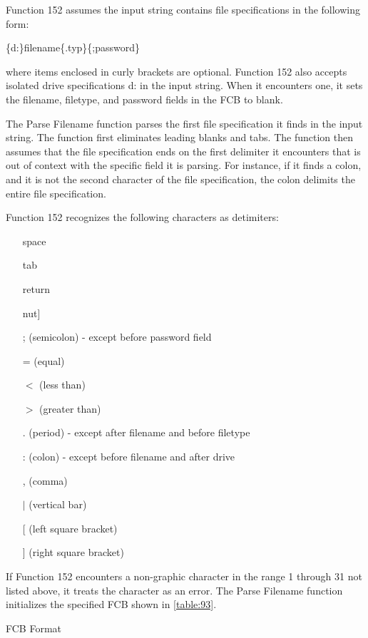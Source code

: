 Function 152 assumes the input string contains file specifications in
the following form:

\{d:\}filename\{.typ\}\{;password\}

where items enclosed in curly brackets are optional. Function 152 also
accepts isolated drive specifications d: in the input string. When it
encounters one, it sets the filename, filetype, and password fields in
the FCB to blank.

The Parse Filename function parses the first file specification it
finds in the input string. The function first eliminates leading
blanks and tabs. The function then assumes that the file specification
ends on the first delimiter it encounters that is out of context with
the specific field it is parsing. For instance, if it finds a colon,
and it is not the second character of the file specification, the
colon delimits the entire file specification.

Function 152 recognizes the following characters as detimiters:

\begin{itemize}
\item[] space
\item[] tab
\item[] return
\item[] nut]
\item[] ; (semicolon) - except before password field
\item[] = (equal)
\item[] \(<\) (less than)
\item[] \(>\) (greater than)
\item[] . (period) - except after filename and before filetype
\item[] : (colon) - except before filename and after drive
\item[] , (comma)
\item[] \(|\) (vertical bar)
\item[] [ (left square bracket)
\item[] ] (right square bracket)
\end{itemize}

If Function 152 encounters a non-graphic character in the range 1
through 31 not listed above, it treats the character as an error. The
Parse Filename function initializes the specified FCB shown in
\ref{table:93}.

\begin{table}[h]\centering
  \caption{FCB Format}
  \label{table:93}
\end{table}

